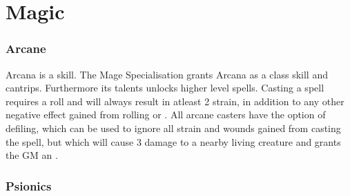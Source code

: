 \chapter{Magic}
\begin{multicols*}{2}

\subsection{Arcane}
Arcana is a skill. The Mage Specialisation grants Arcana as a class skill and cantrips. Furthermore its talents unlocks higher level spells. Casting a spell
requires a roll and will always result in atleast 2 strain, in addition to any other negative effect gained from rolling \threat or \despair. All arcane
casters have the option of defiling, which can be used to ignore all strain and wounds gained from casting the spell, but which will cause 3 damage to a
nearby living creature and grants the GM an \dark.

\subsection{Psionics}

\end{multicols*}
